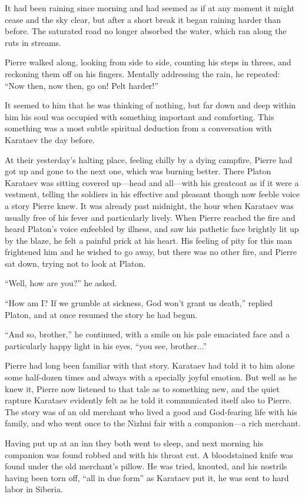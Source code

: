 It had been raining since morning and had seemed as if at any
moment it might cease and the sky clear, but after a short break
it began raining harder than before. The saturated road no longer
absorbed the water, which ran along the ruts in streams.

Pierre walked along, looking from side to side, counting his
steps in threes, and reckoning them off on his fingers. Mentally
addressing the rain, he repeated: ``Now then, now then, go on!
Pelt harder!''

It seemed to him that he was thinking of nothing, but far down
and deep within him his soul was occupied with something
important and comforting. This something was a most subtle
spiritual deduction from a conversation with Karataev the day
before.

At their yesterday's halting place, feeling chilly by a dying
campfire, Pierre had got up and gone to the next one, which was
burning better.  There Platon Karataev was sitting covered
up---head and all---with his greatcoat as if it were a vestment,
telling the soldiers in his effective and pleasant though now
feeble voice a story Pierre knew. It was already past midnight,
the hour when Karataev was usually free of his fever and
particularly lively. When Pierre reached the fire and heard
Platon's voice enfeebled by illness, and saw his pathetic face
brightly lit up by the blaze, he felt a painful prick at his
heart. His feeling of pity for this man frightened him and he
wished to go away, but there was no other fire, and Pierre sat
down, trying not to look at Platon.

``Well, how are you?'' he asked.

``How am I? If we grumble at sickness, God won't grant us
death,'' replied Platon, and at once resumed the story he had
begun.

``And so, brother,'' he continued, with a smile on his pale
emaciated face and a particularly happy light in his eyes, ``you
see, brother...''

Pierre had long been familiar with that story. Karataev had told
it to him alone some half-dozen times and always with a specially
joyful emotion. But well as he knew it, Pierre now listened to
that tale as to something new, and the quiet rapture Karataev
evidently felt as he told it communicated itself also to
Pierre. The story was of an old merchant who lived a good and
God-fearing life with his family, and who went once to the Nizhni
fair with a companion---a rich merchant.

Having put up at an inn they both went to sleep, and next morning
his companion was found robbed and with his throat cut. A
bloodstained knife was found under the old merchant's pillow. He
was tried, knouted, and his nostrils having been torn off, ``all
in due form'' as Karataev put it, he was sent to hard labor in
Siberia.

